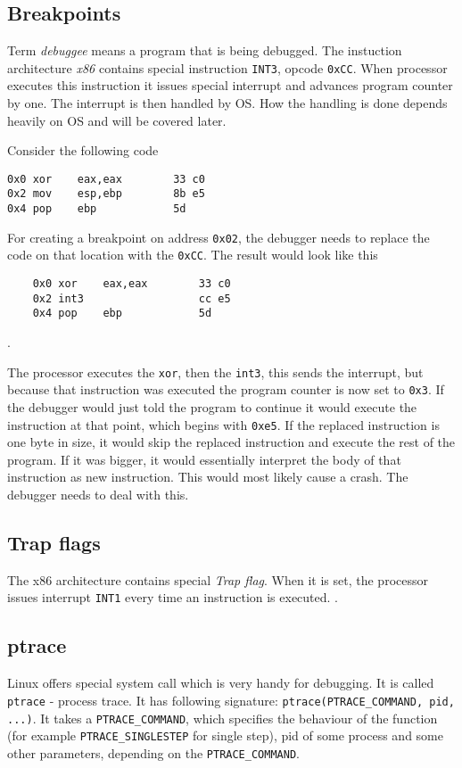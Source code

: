 \subsection{Breakpoints}
Term \textit{debuggee} means a program that is being debugged. The instuction architecture \textit{x86} contains special instruction \lstinline{INT3}, opcode \lstinline{0xCC}. When processor executes this instruction it issues special interrupt and advances program counter by one. The interrupt is then handled by OS. How the handling is done depends heavily on OS and will be covered later. 

Consider the following code
\begin{lstlisting}
0x0 xor    eax,eax        33 c0
0x2 mov    esp,ebp        8b e5
0x4 pop    ebp            5d
\end{lstlisting}

For creating a breakpoint on address \lstinline{0x02}, the debugger needs to replace the code on that location with the \lstinline{0xCC}. The result would look like this

\begin{lstlisting}
    0x0 xor    eax,eax        33 c0
    0x2 int3                  cc e5
    0x4 pop    ebp            5d
\end{lstlisting}.

The processor executes the \lstinline{xor}, then the \lstinline{int3}, this sends the interrupt, but because that instruction was executed the program counter is now set to \lstinline{0x3}. If the debugger would just told the program to continue it would execute the instruction at that point, which begins with \lstinline{0xe5}. If the replaced instruction is one byte in size, it would skip the replaced instruction and execute the rest of the program. If it was bigger, it would essentially interpret the body of that instruction as new instruction. This would most likely cause a crash. The debugger needs to deal with this. 

\subsection{Trap flags}
The x86 architecture contains special \textit{Trap flag}. When it is set, the processor issues interrupt \texttt{INT1} every time an instruction is executed. .

\subsection{ptrace}
Linux offers special system call which is very handy for debugging. It is called \lstinline{ptrace} \cite{ptrace} - process trace. It has following signature: \lstinline{ptrace(PTRACE_COMMAND, pid, ...)}. It takes a \lstinline{PTRACE_COMMAND}, which specifies the behaviour of the function (for example \lstinline{PTRACE_SINGLESTEP} for single step), pid of some process and some other parameters, depending on the \lstinline{PTRACE_COMMAND}. 

